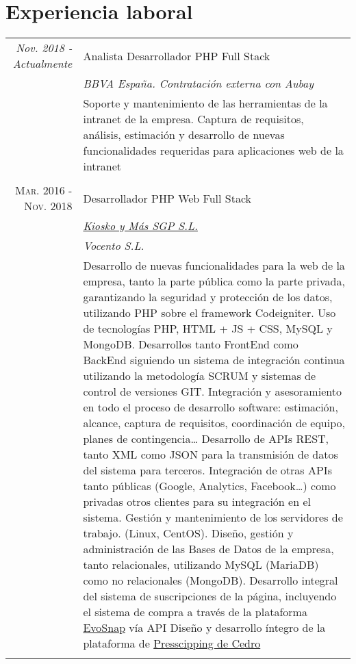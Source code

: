 \documentclass[a4paper,10pt]{article}
\begin{document}
\section{Experiencia laboral}
\begin{tabular}{r|p{11cm}}
 	\emph{Nov. 2018 - Actualmente}&		Analista Desarrollador PHP Full Stack \\&
 	\emph{BBVA España. Contratación externa con Aubay}\\&
 	\footnotesize{
 		Soporte y mantenimiento de las herramientas de la intranet de la empresa.\newline
		Captura de requisitos, análisis, estimación y desarrollo de nuevas funcionalidades requeridas para aplicaciones web de la intranet
 	}\\
 	\multicolumn{2}{c}{} \\
 	

 	\textsc{Mar. 2016 - Nov. 2018} & 	Desarrollador PHP Web Full Stack \\&
	\emph{\href{https://www.kioskoymas.com}{Kiosko y Más SGP S.L.}}\\&
	\emph{Vocento S.L.}\\&
	\footnotesize{
		Desarrollo de nuevas funcionalidades para la web de la empresa, tanto la parte pública como la parte privada, garantizando la seguridad y protección de los datos, utilizando PHP sobre el framework Codeigniter.\newline
		Uso de tecnologías PHP, HTML + JS + CSS, MySQL y MongoDB. \newline
		Desarrollos tanto FrontEnd como BackEnd siguiendo un sistema de integración continua utilizando la metodología SCRUM y sistemas de control de versiones GIT.\newline
		Integración y asesoramiento en todo el proceso de desarrollo software: estimación, alcance, captura de requisitos, coordinación de equipo, planes de contingencia… \newline
		Desarrollo de APIs REST, tanto XML como JSON para la transmisión de datos del sistema para terceros. \newline
		Integración de otras APIs tanto públicas (Google, Analytics, Facebook…) como privadas otros clientes para su integración en el sistema.\newline
		Gestión y mantenimiento de los servidores de trabajo. (Linux, CentOS).\newline
		Diseño, gestión y administración de las Bases de Datos de la empresa, tanto relacionales, utilizando MySQL (MariaDB) como no relacionales (MongoDB).\newline
		Desarrollo integral del sistema de suscripciones de la página, incluyendo el sistema de compra a través de la plataforma \href{https://www.evosnap.com/}{EvoSnap} vía API\newline
		Diseño y desarrollo íntegro de la plataforma de \href{http://pressclipping.cedro.org}{Presscipping de Cedro}	
	}
	\\\multicolumn{2}{c}{} \\


\end{tabular}
\end{document}

